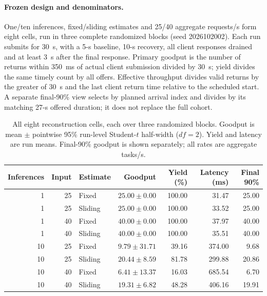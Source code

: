 \paragraph{Frozen design and denominators.}
One/ten inferences, fixed/sliding estimates and 25/40 aggregate requests/s form eight cells, run in three complete randomized blocks (seed 2026102002). Each run submits for 30~s, with a 5-s baseline, 10-s recovery, all client responses drained and at least 3~s after the final response. Primary goodput is the number of returns within 350~ms of actual client submission divided by 30~s; yield divides the same timely count by all offers. Effective throughput divides valid returns by the greater of 30~s and the last client return time relative to the scheduled start. A separate final-90\% view selects by planned arrival index and divides by its matching 27-s offered duration; it does not replace the full cohort.

\begin{table}[htbp]
\centering\small
\caption{All eight reconstruction cells, each over three randomized blocks. Goodput is mean $\pm$ pointwise 95\% run-level Student-$t$ half-width ($df=2$). Yield and latency are run means. Final-90\% goodput is shown separately; all rates are aggregate tasks/s.}
\label{tab:estimator-reconstruction-cells}
\begin{tabular}{rrlrrrr}
\toprule
Inferences & Input & Estimate & Goodput & Yield (\%) & Latency (ms) & Final 90\%\\
\midrule
1 & 25 & Fixed & $25.00\pm0.00$ & 100.00 & 31.47 & 25.00\\
1 & 25 & Sliding & $25.00\pm0.00$ & 100.00 & 33.52 & 25.00\\
1 & 40 & Fixed & $40.00\pm0.00$ & 100.00 & 37.97 & 40.00\\
1 & 40 & Sliding & $40.00\pm0.00$ & 100.00 & 35.51 & 40.00\\
10 & 25 & Fixed & $9.79\pm31.71$ & 39.16 & 374.00 & 9.68\\
10 & 25 & Sliding & $20.44\pm8.59$ & 81.78 & 299.88 & 20.86\\
10 & 40 & Fixed & $6.41\pm13.37$ & 16.03 & 685.54 & 6.70\\
10 & 40 & Sliding & $19.31\pm6.82$ & 48.28 & 406.16 & 19.91\\
\bottomrule
\end{tabular}
\end{table}

